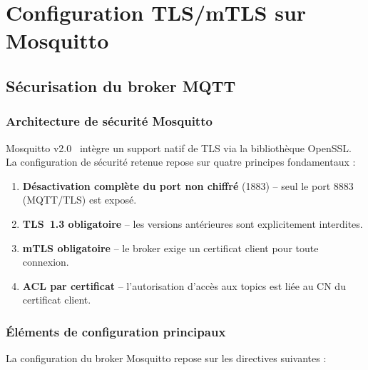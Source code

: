 \chapter{Configuration TLS/mTLS sur Mosquitto}

\section{Sécurisation du broker MQTT}

\subsection{Architecture de sécurité Mosquitto}

Mosquitto v2.0~\cite{mosquitto_tls} intègre un support natif de TLS via la bibliothèque OpenSSL. La configuration de sécurité retenue repose sur quatre principes fondamentaux :

\begin{enumerate}
  \item \textbf{Désactivation complète du port non chiffré} (1883) -- seul le port 8883 (MQTT/TLS) est exposé.
  \item \textbf{TLS~1.3 obligatoire} -- les versions antérieures sont explicitement interdites.
  \item \textbf{mTLS obligatoire} -- le broker exige un certificat client pour toute connexion.
  \item \textbf{ACL par certificat} -- l'autorisation d'accès aux topics est liée au CN du certificat client.
\end{enumerate}

\subsection{Éléments de configuration principaux}

La configuration du broker Mosquitto repose sur les directives suivantes :

